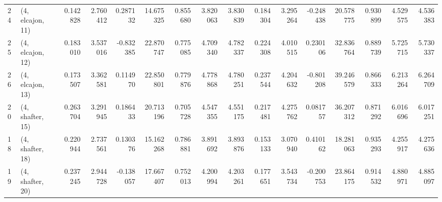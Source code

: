\begin{tabular}{llrrrrrrrrrrrrrr}
24 &  (4, elcajon, 11) &   0.142828 &  2.760412 &  0.287132 &  14.675325 &  0.855680 &   3.820063 &  3.830839 &  0.184304 &  3.295264 & -0.248438 &   20.578775 &  0.930899 &   4.529575 &   4.536383 \\
25 &  (4, elcajon, 12) &   0.183010 &  3.537016 & -0.832385 &  22.870747 &  0.775085 &   4.709340 &  4.782337 &  0.224308 &  4.010515 &  0.230106 &   32.836764 &  0.889739 &   5.725715 &   5.730337 \\
26 &  (4, elcajon, 13) &   0.173507 &  3.362581 &  0.114970 &  22.850801 &  0.779876 &   4.778868 &  4.780251 &  0.237544 &  4.204632 & -0.801208 &   39.246579 &  0.866333 &   6.213264 &   6.264709 \\
20 &  (4, shafter, 15) &   0.263704 &  3.291945 &  0.186433 &  20.713196 &  0.705728 &   4.547355 &  4.551175 &  0.217481 &  4.275762 &  0.081757 &   36.207312 &  0.871292 &   6.016696 &   6.017251 \\
18 &  (4, shafter, 18) &   0.220944 &  2.737561 &  0.130376 &  15.162268 &  0.786881 &   3.891692 &  3.893876 &  0.153133 &  3.070940 &  0.410162 &   18.281063 &  0.935293 &   4.255917 &   4.275636 \\
19 &  (4, shafter, 20) &   0.237245 &  2.944728 & -0.138057 &  17.667407 &  0.752013 &   4.200994 &  4.203261 &  0.177651 &  3.543734 & -0.200753 &   23.864175 &  0.914532 &   4.880971 &   4.885097 \\
\bottomrule
\end{tabular}
